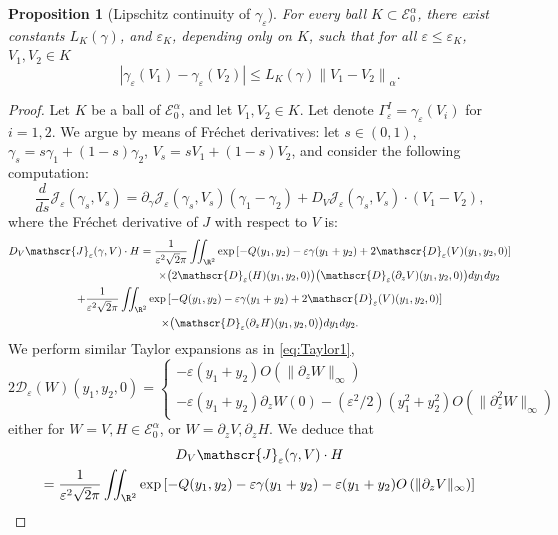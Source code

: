 \documentclass[JEP,XML,SOM,Unicode]{cedram}
\let\mathcal\mathscr
\theoremstyle{plain}
\newtheorem{prop}[thm]{Proposition}
\theoremstyle{definition}
\newcommand{\D}{\mathcal{D}_\eps}
\newcommand{\Je}{\mathcal{J}_\eps}
\let\eps\varepsilon
\newcommand{\abs}[1]{\left\lvert#1\right\rvert}
\newcommand{\nalph}[1]{\left\lVert#1\right\rVert_\alpha}
\newcommand{\Eaz}{\mathcal{E}^\alpha_0}
\newcommand{\Cgamma}{L_K(\gamma)}
\newcommand{\GammaI}{\Gamma^I_{\eps}}
\begin{document}
\begin{prop}[Lipschitz continuity of $\gamma_\eps$]\label{contraction gamma}
For every ball $K\subset \Eaz$, there exist constants $\Cgamma$, and $\eps_K $, depending only on $K$, such that for all $\eps \leq \eps_K$, $V_1, V_2 \in K$
\begin{equation*}
\abs{\gamma_\eps(V_1)-\gamma_\eps(V_2)} \leq \Cgamma \nalph{V_1-V_2}.
\end{equation*}
\end{prop}
\begin{proof}
Let $K$ be a ball of $\Eaz$, and let $V_1,V_2 \in K$. Let denote $\GammaI = \gamma_\eps(V_i)$ for $i = 1,2$.
We argue by means of Fréchet derivatives: let $s\in (0,1)$, $\gamma_s = s \gamma_1 + (1-s)\gamma_2$, $V_s = s V_1 + (1-s)V_2$, and consider the following computation:
\begin{equation}\label{eq:dsJ}
\dfrac{d}{ds} \Je(\gamma_s, V_s) = \partial_\gamma \Je(\gamma_s,V_s) (\gamma_1 - \gamma_2) + D_V \Je (\gamma_s,V_s)\cdot (V_1 - V_2),
\end{equation}
where the Fréchet derivative of $J$ with respect to $V$ is:
\begin{multline*}
D_V \Je(\gamma,V)\cdot H = \dfrac{1}{\eps^2\sqrt{2}\pi} \iint_{\R^2} \exp \left[-Q(y_1,y_2)- \eps \gamma (y_1+y_2) + 2 \D(V)(y_1,y_2,0) \right] \\
\shoveright{\times \bigl (2 \D(H)(y_1,y_2,0) \bigr) \bigl(\D(\partial_z V)(y_1,y_2,0) \bigr) d y_1 d y_2} \\ +
\dfrac{1}{\eps^2 \sqrt{2}\pi} \iint_{\R^2} \exp \left[-Q(y_1,y_2)- \eps \gamma (y_1+y_2) + 2 \D(V)(y_1,y_2,0) \right]\\
\times \bigl(\D(\partial_z H)(y_1,y_2,0) \bigr) d y_1 d y_2.
\end{multline*}
We perform similar Taylor expansions as in \eqref{eq:Taylor1},
\begin{equation*}
2 \D(W)(y_1,y_2,0) =
\begin{cases}
-\eps (y_1 + y_2) O\left (\|\partial_z W\|_\infty \right)\\
-\eps (y_1 + y_2)\partial_z W(0) - (\eps^2/2)\left (y_1^2 + y_2^2 \right) O\left (\|\partial_z^2 W\|_\infty \right)
\end{cases}
\end{equation*}
either for $W =V, H\in \Eaz$, or $W = \partial_z V, \partial_z H$. We deduce that
\begin{multline}\label{eq:DVJ}
D_V \Je(\gamma,V)\cdot H\\
= \dfrac{1}{\eps^2 \sqrt{2}\pi} \iint_{\R^2} \exp \left[-Q(y_1,y_2)- \eps \gamma (y_1+y_2) -\eps (y_1 + y_2) O\left (\|\partial_z V\|_\infty \right) \right] \\

\end{multline}
\end{proof}
\end{document}
